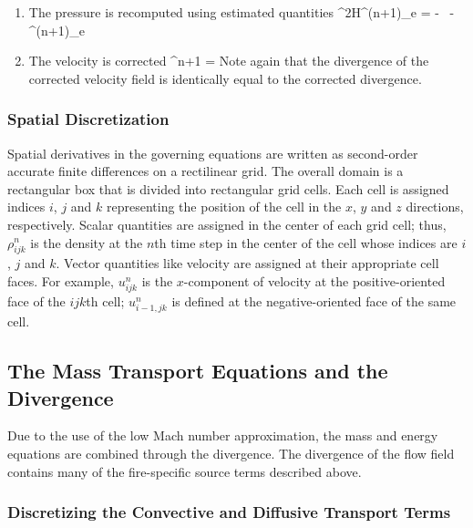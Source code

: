 \documentclass[11pt]{book}
\begin{document}
\begin{enumerate}
\item The pressure is recomputed using estimated quantities
\be \nabla^2{\cal H}^{(n+1)_e} = - \, 
  - \nabla \cdot \bF^{(n+1)_e}  \ee

\item The velocity is corrected
\be \bu^{n+1} = \ha {} \ee
Note again that the divergence of the corrected velocity field is
identically equal to the corrected divergence.

\end{enumerate}

\subsubsection{Spatial Discretization}

Spatial derivatives in the governing equations are written as second-order accurate
finite differences on a rectilinear grid. The overall
domain is a rectangular box that is divided into rectangular grid cells.
Each cell is assigned indices $i$, $j$ and $k$ representing the
position of the cell in the $x$, $y$ and $z$ directions, respectively.
Scalar quantities are assigned in the center of each grid cell; thus,
$\rho_{ijk}^n$ is the density at the $n$th time step in the center
of the cell whose indices are $i$, $j$ and $k$. Vector quantities like
velocity are assigned at their appropriate cell faces. For example,
$u_{ijk}^n$ is the $x$-component of velocity at the
positive-oriented face of the $ijk$th cell; $u_{i-1,jk}^n$ is defined at the
negative-oriented face of the same cell.


\clearpage
\subsection{The Mass Transport Equations and the Divergence}

Due to the use of the low Mach number approximation, the
mass and energy equations are combined through the divergence. The
divergence of the flow field contains
many of the fire-specific source terms described above.

\subsubsection{Discretizing the Convective and Diffusive Transport Terms}
\end{document}

